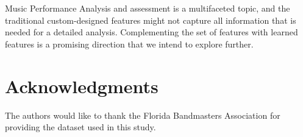 \documentclass{ws-ijsc}
\begin{document}
Music Performance Analysis and assessment is a multifaceted topic, and the traditional custom-designed features might not capture all information that is needed for a detailed analysis. Complementing the set of features with learned features is a promising direction that we intend to explore further.



\section*{Acknowledgments}

The authors would like to thank the Florida Bandmasters Association for providing the dataset used in this study.



%
%
%



\end{document}
